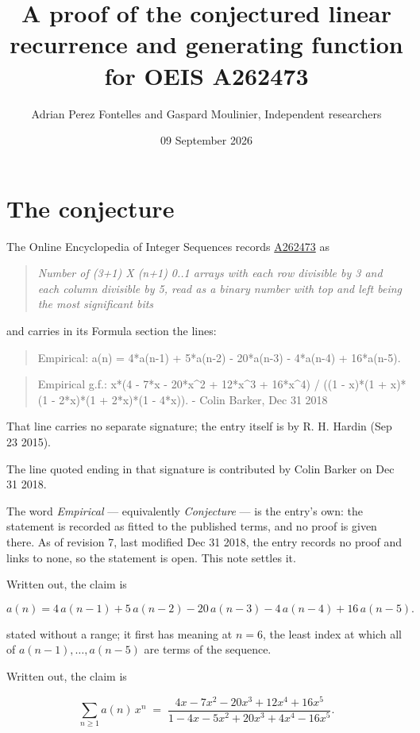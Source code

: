\documentclass[11pt]{article}
\title{A proof of the conjectured linear recurrence and generating function for OEIS A262473}
\author{Adrian Perez Fontelles and Gaspard Moulinier, Independent researchers}
\date{09 September 2026}
\theoremstyle{definition}
\begin{document}
\maketitle
\section{The conjecture}

The Online Encyclopedia of Integer Sequences records \href{https://oeis.org/A262473}{A262473} as

\begin{quote}\itshape Number of (3+1) X (n+1) 0..1 arrays with each row divisible by 3 and each column divisible by 5, read as a binary number with top and left being the most significant bits\end{quote}

and carries in its Formula section the lines:

\begin{quote}\ttfamily Empirical: a(n) = 4*a(n-1) + 5*a(n-2) - 20*a(n-3) - 4*a(n-4) + 16*a(n-5).\end{quote}

\begin{quote}\ttfamily Empirical g.f.: x*(4 - 7*x - 20*x\textasciicircum{}2 + 12*x\textasciicircum{}3 + 16*x\textasciicircum{}4) / ((1 - x)*(1 + x)*(1 - 2*x)*(1 + 2*x)*(1 - 4*x)). - Colin Barker, Dec 31 2018\end{quote}

That line carries no separate signature; the entry itself is by R. H. Hardin (Sep 23 2015).

The line quoted ending in that signature is contributed by Colin Barker on Dec 31 2018.

The word {\itshape Empirical} --- equivalently {\itshape Conjecture} --- is the entry's own: the statement is recorded as fitted to the published terms, and no proof is given there. As of revision 7, last modified Dec 31 2018, the entry records no proof and links to none, so the statement is open. This note settles it.

Written out, the claim is

\[a(n) = 4\,a(n-1) + 5\,a(n-2) - 20\,a(n-3) - 4\,a(n-4) + 16\,a(n-5).\]

stated without a range; it first has meaning at $n = 6$, the least index at which all of $a(n-1),\dots,a(n-5)$ are terms of the sequence.

Written out, the claim is

\[\sum_{n \ge 1} a(n)\,x^n \;=\; \frac{4x - 7x^{2} - 20x^{3} + 12x^{4} + 16x^{5}}{1 - 4x - 5x^{2} + 20x^{3} + 4x^{4} - 16x^{5}}.\]
\end{document}
